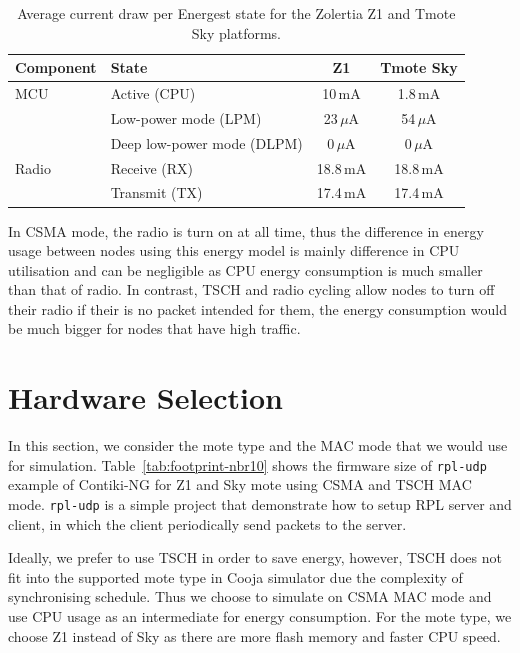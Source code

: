 \begin{table}[ht]
    \centering
    \caption{Average current draw per Energest state for the Zolertia
    Z1 and Tmote Sky platforms.}
    \label{tab:current-draw}
    \begin{tabular}{llcc}
        \hline
        \textbf{Component} & \textbf{State} & \textbf{Z1} &
        \textbf{Tmote Sky} \\
        \hline
        MCU   & Active (CPU)                 & 10\,mA       & 1.8\,mA \\
        & Low-power mode (LPM)         & 23\,$\mu$A   & 54\,$\mu$A   \\
        & Deep low-power mode (DLPM)   & 0\,$\mu$A    & 0\,$\mu$A    \\
        \hline
        Radio & Receive (RX)                 & 18.8\,mA     & 18.8\,mA     \\
        & Transmit (TX)                & 17.4\,mA     & 17.4\,mA     \\
        \hline
    \end{tabular}
\end{table}

In CSMA mode, the radio is turn on at all time, thus the difference
in energy usage between nodes using this energy model is mainly
difference in CPU utilisation and can be negligible as CPU energy
consumption is much smaller than that of radio. In contrast, TSCH and
radio cycling allow nodes to turn off their radio if their is no
packet intended for them, the energy consumption would be much bigger
for nodes that have high traffic.

\section{Hardware Selection}
In this section, we consider the mote type and the MAC mode that we
would use for simulation. Table~\ref{tab:footprint-nbr10} shows the
firmware size of \texttt{rpl-udp} example of Contiki-NG for Z1 and
Sky mote using CSMA and TSCH MAC mode. \texttt{rpl-udp} is a simple
project that demonstrate how to setup RPL server and client, in which
the client periodically send packets to the server.

Ideally, we prefer to use TSCH in order to save energy, however, TSCH
does not fit into the supported mote type in Cooja simulator due the
complexity of synchronising schedule. Thus we choose to simulate on
CSMA MAC mode and use CPU usage as an intermediate for energy
consumption. For the mote type, we choose Z1 instead of Sky as there
are more flash memory and faster CPU speed.

